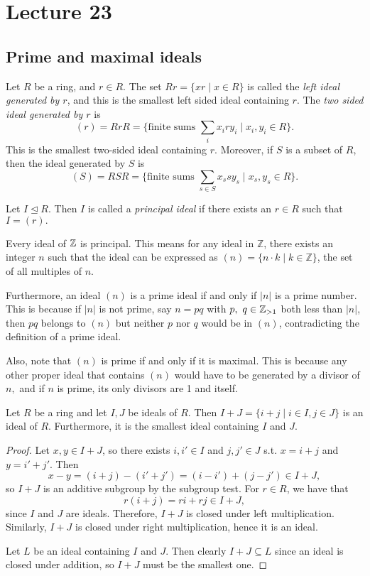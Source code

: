 \section{Lecture 23}
\subsection{Prime and maximal ideals}
\begin{definition}
  Let $R$ be a ring, and $r\in R$. The set $Rr=\{xr \mid x\in R\}$ is called the \emph{left
  ideal generated by $r$}, and this is the smallest left sided ideal containing $r$. The
  \emph{two sided ideal generated by $r$} is
  \[(r)=RrR= \{\text{finite sums }\sum_i x_i r y_i \mid x_i,y_i\in R\}.\]
  This is the smallest two-sided ideal containing $r$. 
   Moreover, if $S$ is a subset of $R$, then
  the ideal generated by $S$ is
  \[(S)=RSR = \{\text{finite sums }\sum_{s\in S} x_s s y_s \mid x_s,y_s\in R \}.\]
\end{definition}

\begin{definition}
     Let $I\unlhd R.$ Then $I$ is called a \emph{principal ideal} if there exists an $r\in R$ such that $I=(r).$
  
\end{definition}
\begin{example}
  Every ideal of $\mathbb Z$ is principal. This means for any ideal in $\mathbb{Z}$, there exists an integer $n$ such that the ideal can be expressed as $(n) = \{ n \cdot k \mid k \in \mathbb{Z} \}$, the set of all multiples of $n$.
  
  Furthermore, an ideal $(n)$ is a prime ideal if and only if $|n|$ is a prime number. This is because if $|n|$ is not prime, say $n = pq$ with $p,\text{ }q\in \mathbb Z_{>1}$ both less than $|n|$, then $pq$ belongs to $(n)$ but neither $p$ nor $q$ would be in $(n)$, contradicting the definition of a prime ideal.
  
  Also, note that $(n)$ is prime if and only if it is maximal. This is because any other proper ideal that contains $(n)$ would have to be generated by a divisor of $n,$ and if $n$ is prime, its only divisors are 1 and itself.
\end{example}

\begin{theorem}
  Let $R$ be a ring and let $I,J$ be ideals of $R$. Then $I+J=\{i+j\mid i\in I, j\in J\}$ is
  an ideal of $R$. Furthermore, it is the smallest ideal containing $I$ and $J$.
  \label{<+label+>}
\end{theorem}
\begin{proof}
  Let $x,y\in I+J$, so there exists $i,i'\in I$ and $j,j'\in J$ s.t. $x=i+j$ and $y=i'+j'$. Then $$x-y=(i+j)-(i'+j')=(i-i')+(j-j')\in I+J,$$ so $I+J$ is an additive subgroup by the subgroup test. For $r\in R$, we have that
  $$r(i+j)=ri+rj\in I+J,$$
  since $I$ and $J$ are ideals.
  Therefore, $I+J$ is closed
  under left multiplication. Similarly, $I+J$ is closed under right multiplication, hence it is an ideal.

  Let $L$ be an ideal containing $I$ and $J$. Then clearly $I+J \subseteq L$ since an ideal is closed under addition, so $I+J$ must be the smallest one.
\end{proof}

